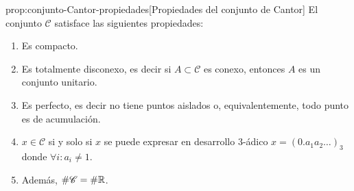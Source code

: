  
 \begin{proposicion}{prop:conjunto-Cantor-propiedades}[Propiedades del conjunto de Cantor] El conjunto $\mathscr{C}$ satisface las siguientes propiedades: 
 
 \begin{enumerate}[label=\emph{\alph*})]
  \item\label{inc:cantor1} Es compacto.
  \item\label{inc:cantor2} Es totalmente disconexo, es decir si $A\subset\mathscr{C}$ es conexo, entonces $A$ es un conjunto unitario. 
  \item\label{inc:cantor3} Es perfecto, es decir no tiene puntos aislados o, equivalentemente, todo punto es de acumulación. 
  \item\label{inc:cantor4} $x\in \mathscr{C}$ si y solo si $x$ se puede expresar en desarrollo $3$-ádico $x=(0.a_1a_2\ldots)_3$ donde $\forall i: a_i\neq 1$.
  \item\label{inc:cantor5} Adem\'as, $\# \mathscr{C}=\# \mathbb{R}$.
 \end{enumerate}
 \end{proposicion}
 
